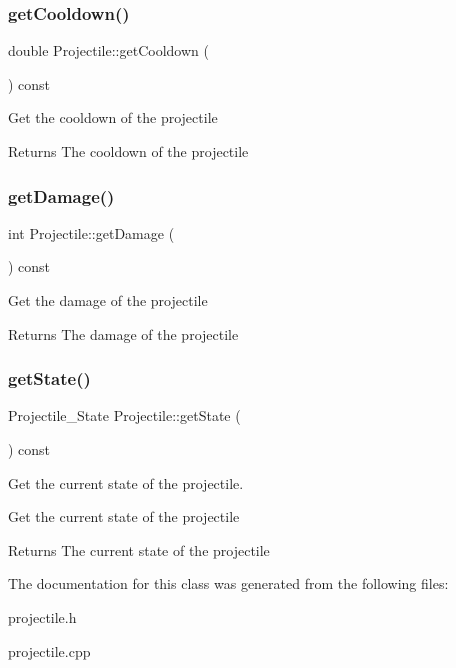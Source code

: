 \subsubsection{\texorpdfstring{get\+Cooldown()}{getCooldown()}}
{\footnotesize\ttfamily double Projectile\+::get\+Cooldown (\begin{DoxyParamCaption}{ }\end{DoxyParamCaption}) const}

Get the cooldown of the projectile \begin{DoxyReturn}{Returns}
The cooldown of the projectile 
\end{DoxyReturn}
\mbox{\label{classProjectile_af5cd30772ad4cb3894629ca76c6b8f79}} 
\subsubsection{\texorpdfstring{get\+Damage()}{getDamage()}}
{\footnotesize\ttfamily int Projectile\+::get\+Damage (\begin{DoxyParamCaption}{ }\end{DoxyParamCaption}) const}

Get the damage of the projectile \begin{DoxyReturn}{Returns}
The damage of the projectile 
\end{DoxyReturn}
\mbox{\label{classProjectile_aa864e84b8777bed6114ef09da0c9bdad}} 
\subsubsection{\texorpdfstring{get\+State()}{getState()}}
{\footnotesize\ttfamily Projectile\+\_\+\+State Projectile\+::get\+State (\begin{DoxyParamCaption}{ }\end{DoxyParamCaption}) const}



Get the current state of the projectile. 

Get the current state of the projectile \begin{DoxyReturn}{Returns}
The current state of the projectile 
\end{DoxyReturn}


The documentation for this class was generated from the following files\+:\begin{DoxyCompactItemize}
\item 
projectile.\+h\item 
projectile.\+cpp\end{DoxyCompactItemize}

